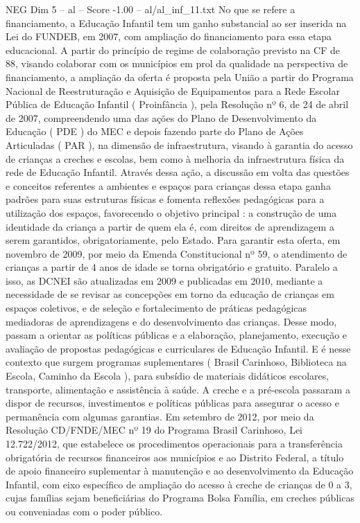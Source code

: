\begin{textsample}{NEG Dim 5 – al – Score -1.00 – al/al\_inf\_11.txt}
No que se refere a financiamento, a Educação Infantil tem um ganho substancial ao ser inserida na Lei do FUNDEB, em 2007, com ampliação do financiamento para essa etapa educacional.
A partir do princípio de regime de colaboração previsto na CF de 88, visando colaborar com os municípios em prol da qualidade na perspectiva de financiamento, a ampliação da oferta é proposta pela União a partir do Programa Nacional de Reestruturação e Aquisição de Equipamentos para a Rede Escolar Pública de Educação Infantil ( Proinfância ), pela Resolução nº 6, de 24 de abril de 2007, compreendendo uma das ações do Plano de Desenvolvimento da Educação ( PDE ) do MEC e depois fazendo parte do Plano de Ações Articuladas ( PAR ), na dimensão de infraestrutura, visando à garantia do acesso de crianças a creches e escolas, bem como à melhoria da infraestrutura física da rede de Educação Infantil.
Através dessa ação, a discussão em volta das questões e conceitos referentes a ambientes e espaços para crianças dessa etapa ganha padrões para suas estruturas físicas e fomenta reflexões pedagógicas para a utilização dos espaços, favorecendo o objetivo principal : a construção de uma identidade da criança a partir de quem ela é, com direitos de aprendizagem a serem garantidos, obrigatoriamente, pelo Estado.
Para garantir esta oferta, em novembro de 2009, por meio da Emenda Constitucional nº 59, o atendimento de crianças a partir de 4 anos de idade se torna obrigatório e gratuito.
Paralelo a isso, as DCNEI são atualizadas em 2009 e publicadas em 2010, mediante a necessidade de se revisar as concepções em torno da educação de crianças em espaços coletivos, e de seleção e fortalecimento de práticas pedagógicas mediadoras de aprendizagens e do desenvolvimento das crianças.
Desse modo, passam a orientar as políticas públicas e a elaboração, planejamento, execução e avaliação de propostas pedagógicas e curriculares de Educação Infantil.
E é nesse contexto que surgem programas suplementares ( Brasil Carinhoso, Biblioteca na Escola, Caminho da Escola ), para subsídio de materiais didáticos escolares, transporte, alimentação e assistência à saúde.
A creche e a pré-escola passaram a dispor de recursos, investimentos e políticas públicas para assegurar o acesso e permanência com algumas garantias.
Em setembro de 2012, por meio da Resolução CD/FNDE/MEC nº 19 do Programa Brasil Carinhoso, Lei 12.722/2012, que estabelece os procedimentos operacionais para a transferência obrigatória de recursos financeiros aos municípios e ao Distrito Federal, a título de apoio financeiro suplementar à manutenção e ao desenvolvimento da Educação Infantil, com eixo específico de ampliação do acesso à creche de crianças de 0 a 3, cujas famílias sejam beneficiárias do Programa Bolsa Família, em creches públicas ou conveniadas com o poder público.

\end{textsample}
